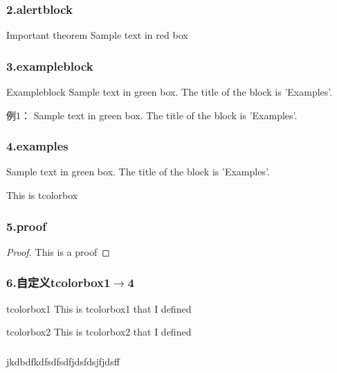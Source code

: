 \begin{frame}
    \frametitle{2.alertblock}
	\begin{alertblock}{Important theorem}
		Sample text in red box
	\end{alertblock}
\end{frame}

\begin{frame}
    \frametitle{3.exampleblock}
	\begin{exampleblock} {Exampleblock}
		Sample text in green box. The title of the block is 'Examples'.
	\end{exampleblock}
    \begin{exampleblock} {例1：}
		Sample text in green box. The title of the block is 'Examples'.
	\end{exampleblock}
\end{frame}

\begin{frame}
    \frametitle{4.examples}
	\begin{examples}
		Sample text in green box. The title of the block is 'Examples'.
	\end{examples}
  \begin{tcolorbox}[title=5.tcolorbox,colframe=red!75!black]
    This is tcolorbox
  \end{tcolorbox}
\end{frame}

\begin{frame}
    \frametitle{5.proof}
    \begin{proof}{}
      This is a proof
    \end{proof}
\end{frame}

\begin{frame}
    \frametitle{6.自定义tcolorbox1$\to$4}
    \begin{tcolorbox1}[3]{tcolorbox1}
      This is tcolorbox1 that I defined
    \end{tcolorbox1}
    \begin{tcolorbox2}[4]{tcolorbox2}
      This is tcolorbox2 that I defined
    \end{tcolorbox2}
\end{frame}
\begin{frame}
  \frametitle{}
  \begin{tcolorbox3}[量子力学基本假设1/5]
    \lipsum[4]
  \end{tcolorbox3}
  \end{frame}
  \begin{frame}    
    \begin{tcolorbox4}[量子力学基本假设1/5]
    \lipsum[4]jkdbdfkdfsdfsdfjdsfdsjfjdsff
    \end{tcolorbox4}
\end{frame}

